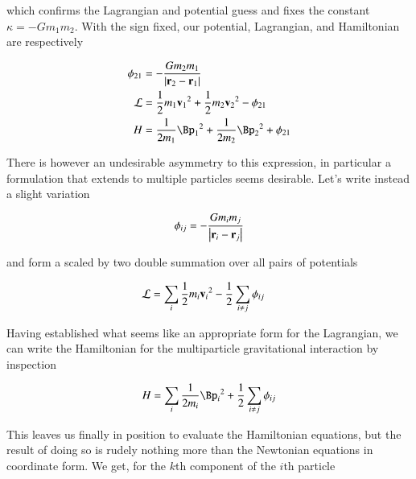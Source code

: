 which confirms the Lagrangian and potential guess and fixes the constant $\kappa = - G m_1 m_2$.  With the sign fixed, our potential, Lagrangian, and Hamiltonian are respectively

\begin{align}\label{eqn:hamiltonian:moo5}
\phi_{21} &= -\frac{G m_2 m_1 }{\Abs{\Br_2 - \Br_1}}  \\
\LL &= \inv{2} m_1 {\Bv_1}^2 +\inv{2} m_2 {\Bv_2}^2 - \phi_{21} \\
H &= \inv{2 m_1} {\Bp_1}^2 +\inv{2 m_2} {\Bp_2}^2 + \phi_{21}
\end{align}

There is however an undesirable asymmetry to this expression, in particular a formulation that extends to multiple particles seems desirable.  Let's write instead a slight variation

\begin{align}\label{eqn:hamiltonian:moo6}
\phi_{ij} = - \frac{G m_i m_j}{\left\lvert{\mathbf{r}_i - \mathbf{r}_j}\right\rvert}
\end{align}

and form a scaled by two double summation over all pairs of potentials

\begin{align}\label{eqn:hamiltonian:moo7}
\mathcal{L} &= \sum_i \frac{1}{2} m_i {\mathbf{v}_i}^2 - \frac{1}{2} \sum_{i \ne j} \phi_{ij}
\end{align}

%

Having established what seems like an appropriate form for the Lagrangian, we can write the Hamiltonian for the multiparticle gravitational interaction by inspection

\begin{align}\label{eqn:hamiltonian:moo9}
H = \sum_i \inv{2 m_i} {\Bp_i}^2 + \inv{2} \sum_{i \ne j} \phi_{ij}
\end{align}

This leaves us finally in position to evaluate the Hamiltonian equations, but the result of doing so is rudely nothing more than the Newtonian equations in coordinate form.  We get, for the $k$th component of the $i$th particle 

